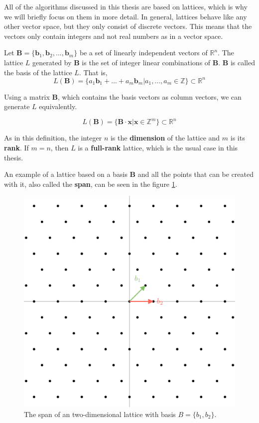 All of the algorithms discussed in this thesis are based on lattices, which is why we will briefly focus on them in more detail. In general, lattices behave like any other vector space, but they only consist of discrete vectors. This means that the vectors only contain integers and not real numbers as in a vector space.

Let $\textbf{B} = \{\textbf{b}_1, \textbf{b}_2, \ldots, \textbf{b}_m\}$ be a set of linearly independent vectors of $\mathbb{R}^n$. The lattice $\textit{L}$ generated by $\textbf{B}$ is the set of integer linear combinations of $\textbf{B}$. $\textbf{B}$ is called the basis of the lattice $\textit{L}$. That is,
$$L(\textbf{B}) = \{a_1\textbf{b}_1 + \ldots + a_m\textbf{b}_m | a_1, \ldots, a_m \in \mathbb{Z}  \} \subset \mathbb{R}^n$$


Using a matrix $\textbf{B}$, which contains the basis vectors as column vectors, we can generate $\textit{L}$ equivalently.

$$L(\textbf{B}) = \{\textbf{B}\cdot\textbf{x} | \textbf{x} \in \mathbb{Z}^m  \} \subset \mathbb{R}^n$$

As in this definition, the integer $n$ is the \textbf{dimension} of the lattice and $m$ is its \textbf{rank}. If $m = n$, then $\textit{L}$ is a \textbf{full-rank} lattice, which is the usual case in this thesis. 

An example of a lattice based on a basis $\textbf{B}$ and all the points that can be created with it, also called the \textbf{span}, can be seen in the figure \ref{fig:latticeGrid}.

\begin{figure}[ht]
  \centering
  \includegraphics[scale=0.2]{images/LatticeGrid.png}
  \caption[Span of an Lattice]{The span of an two-dimensional lattice with basis  $B = \{b_1, b_2\}$.}
  \label{fig:latticeGrid}
\end{figure}

